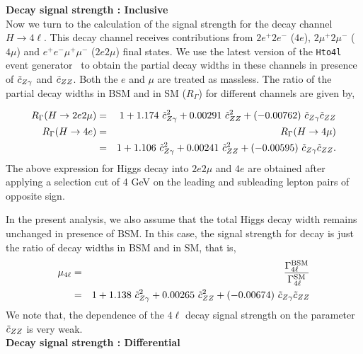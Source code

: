 {\bf Decay signal strength : Inclusive} \\


Now we turn to the calculation of the signal strength for the decay channel $H \to 4\ell$. This decay 
channel receives contributions from $2e^+2e^-$ ($4e$), $2\mu^+ 2\mu^-$ ($4\mu$) and $e^+e^-\mu^+\mu^-$ ($2e2\mu$) final states.
We use the latest version of the {\tt Hto4l} event generator~\cite{Boselli:2017pef} to obtain the partial decay widths in these 
channels in presence of $\tilde c_{Z\gamma}$ and $\tilde c_{ZZ}$. Both the $e$ and $\mu$ are treated as massless. The ratio of the partial decay widths in BSM and in SM ($R_\Gamma$) for different channels are given by, 

{
\begin{eqnarray}
 R_{\Gamma}(H \to 2e2\mu) &=& 1  + 1.174~ \tilde c_{Z\gamma}^2 + 0.00291~ \tilde c_{ZZ}^2  
   + (-0.00762)~\tilde c_{Z\gamma}\tilde c_{ZZ} \\
 R_{\Gamma}(H \to 4e) 
 &=& R_{\Gamma}(H \to 4\mu) \nonumber \\
 &=& 1  + 1.106~ \tilde c_{Z\gamma}^2 + 0.00241~ \tilde c_{ZZ}^2 
   + (-0.00595)~\tilde c_{Z\gamma}\tilde c_{ZZ}.
\end{eqnarray}
}
The above expression for Higgs decay
into $2e2\mu$ and $4e$ are obtained after applying a selection cut of { 4 GeV} on the leading and subleading lepton pairs
of opposite sign.

In the present analysis, we also assume that the total Higgs decay width remains unchanged in presence of BSM. In this
case, the signal strength for decay is just the ratio of decay widths in BSM and in SM, that is,
\begin{eqnarray}\label{eq:mu4l}
 \mu_{4\ell} &=& \frac{\Gamma^{\rm BSM}_{4\ell}}{\Gamma^{\rm SM}_{4\ell}}  \nonumber \\
 &=& 1  + 1.138~ \tilde c_{Z\gamma}^2 + 
 0.00265~ \tilde c_{ZZ}^2  +
 (-0.00674)~ \tilde c_{Z\gamma} \tilde c_{ZZ} 
\end{eqnarray}
We note that, the dependence of the $4\ell$ decay signal strength on the parameter $\tilde c_{ZZ}$ is very weak. \\

{\bf Decay signal strength : Differential} \\

